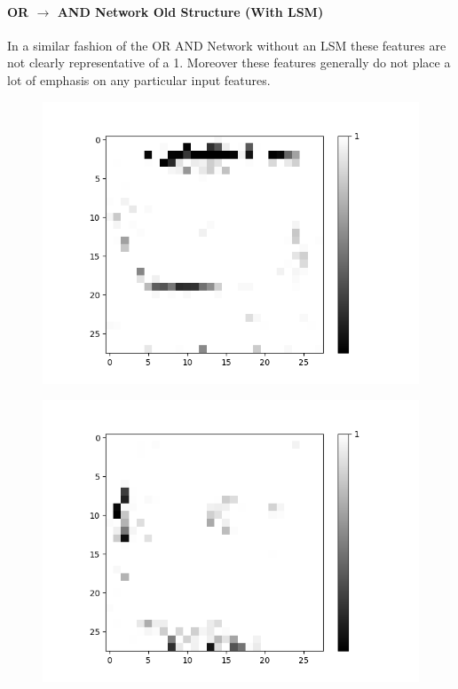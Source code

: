 \paragraph{OR $\rightarrow$ AND Network Old Structure (With LSM)}
In a similar fashion of the OR AND Network without an LSM these features are not clearly representative of a 1. Moreover these features generally do not place a lot of emphasis on any particular input features.
\begin{figure}[H]
	\captionsetup{labelformat=empty}
	\centering
	\begin{minipage}[b]{0.19\textwidth}
		\includegraphics[width=\textwidth]{OR-AND(OLD)(W-LSM)(1)/Layer0-Neuron-0.png}
		\label{}
	\end{minipage}
	\begin{minipage}[b]{0.19\textwidth}
		\includegraphics[width=\textwidth]{OR-AND(OLD)(W-LSM)(1)/Layer0-Neuron-2.png}

\end{minipage}
\end{figure}
